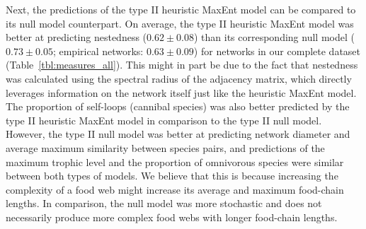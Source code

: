 {\begin{table}[!h]
  \caption{\textbf{Standardized mean difference between predicted network measures and empirical data for all food webs in our abundance dataset ($N = 19$).} Positive (negative) values indicate that the measure is
overestimated (underestimated) on average. Null 1: Type I null model based on
connectance. MaxEnt 1: Type I heuristic MaxEnt model based on connectance.
Null 2: Type II null model based on the joint degree sequence. MaxEnt 2: Type
II heuristic MaxEnt model based on the joint degree sequence. $\rho$:
nestedness measured by the spectral radius of the adjacency matrix.
\textit{maxtl}: maximum trophic level. \textit{diam}: network diameter.
\textit{MxSim}: average maximum similarity between species pairs.
\textit{Cannib}: proportion of cannibal species (self-loops). \textit{Omniv}:
proportion of omnivorous species. \textit{entropy}: SVD entropy.}
  \label{tbl:measures_abund}
\end{table}

\clearpage
}

Next, the predictions of the type II heuristic MaxEnt model can be compared to
its null model counterpart. On average, the type II heuristic MaxEnt model was
better at predicting nestedness ($0.62 \pm 0.08$) than its corresponding null
model ($0.73 \pm 0.05$; empirical networks: $0.63 \pm 0.09$) for networks in our
complete dataset (Table~\ref{tbl:measures_all}). This might in part be due to the
fact that nestedness was calculated using the spectral radius of the adjacency
matrix, which directly leverages information on the network itself just like the
heuristic MaxEnt model. The proportion of self-loops (cannibal species) was also
better predicted by the type II heuristic MaxEnt model in comparison to the type
II null model. However, the type II null model was better at predicting network
diameter and average maximum similarity between species pairs, and predictions
of the maximum trophic level and the proportion of omnivorous species were
similar between both types of models. We believe that this is because increasing
the complexity of a food web might increase its average and maximum food-chain
lengths. In comparison, the null model was more stochastic and does not
necessarily produce more complex food webs with longer food-chain lengths. 

